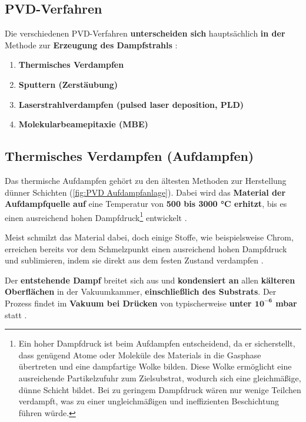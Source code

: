 \documentclass{article} %
\begin{document}
\vspace{1em}
\subsection{PVD-Verfahren} %
Die verschiedenen PVD-Verfahren \textbf{unterscheiden sich} hauptsächlich \textbf{in der} Methode zur \textbf{Erzeugung des Dampfstrahls} 
\cite{keplinger2024}:
\begin{enumerate}
    \item \textbf{Thermisches Verdampfen}
    \item \textbf{Sputtern (Zerstäubung)}
    \item \textbf{Laserstrahlverdampfen (pulsed laser deposition, PLD)}
    \item \textbf{Molekularbeamepitaxie (MBE)}
\end{enumerate}

\vspace{1em}
\subsection{Thermisches Verdampfen (Aufdampfen)} %
Das thermische Aufdampfen gehört zu den ältesten Methoden zur Herstellung dünner Schichten (\autoref{fig:PVD Aufdampfanlage}). Dabei wird das 
\textbf{Material der Aufdampfquelle auf} eine Temperatur von \textbf{500 bis 3000 °C erhitzt}, bis es einen ausreichend hohen 
Dampfdruck\footnote{Ein hoher Dampfdruck ist beim Aufdampfen entscheidend, da er sicherstellt, dass genügend Atome oder Moleküle des Materials 
in die Gasphase übertreten und eine dampfartige Wolke bilden. Diese Wolke ermöglicht eine ausreichende Partikelzufuhr zum Zielsubstrat, wodurch 
sich eine gleichmäßige, dünne Schicht bildet. Bei zu geringem Dampfdruck wären nur wenige Teilchen verdampft, was zu einer ungleichmäßigen und 
ineffizienten Beschichtung führen würde.} entwickelt \cite{keplinger2024}.

\vspace{1em}

Meist schmilzt das Material dabei, doch einige Stoffe, wie beispielsweise Chrom, erreichen bereits vor dem Schmelzpunkt einen ausreichend hohen 
Dampfdruck und sublimieren, indem sie direkt aus dem festen Zustand verdampfen \cite{keplinger2024}.

\vspace{1em}

Der \textbf{entstehende Dampf} breitet sich aus und \textbf{kondensiert an} allen \textbf{kälteren Oberflächen} in der Vakuumkammer, 
\textbf{einschließlich des Substrats}. Der Prozess findet im \textbf{Vakuum bei Drücken} von typischerweise 
\textbf{unter $\mathbf{10^{-6}}$ mbar} statt \cite{keplinger2024}.
\end{document}
